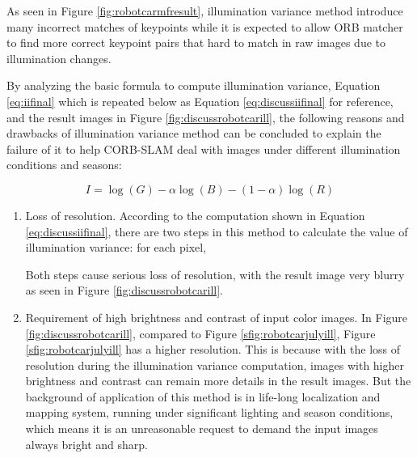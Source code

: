As seen in Figure \ref{fig:robotcarmfresult}, illumination variance method introduce many incorrect matches of keypoints while it is expected to allow ORB matcher to find more correct keypoint pairs that hard to match in raw images due to illumination changes. 

By analyzing the basic formula to compute illumination variance, Equation \ref{eq:iifinal} which is repeated below as Equation \ref{eq:discussiifinal} for reference, and the result images in Figure \ref{fig:discussrobotcarill}, the following reasons and drawbacks of illumination variance method can be concluded to explain the failure of it to help CORB-SLAM deal with images under different illumination conditions and seasons: 

\begin{equation}
I=\log(G)-\alpha\log(B)-(1-\alpha)\log(R)
\label{eq:discussiifinal}
\end{equation}

\begin{enumerate}[1.]
	\item Loss of resolution. According to the computation shown in Equation \ref{eq:discussiifinal}, there are two steps in this method to calculate the value of illumination variance: for each pixel, 
	Both steps cause serious loss of resolution, with the result image very blurry as seen in Figure \ref{fig:discussrobotcarill}. 
	
	\item Requirement of high brightness and contrast of input color images. In Figure \ref{fig:discussrobotcarill}, compared to Figure \ref{sfig:robotcarjulyill}, Figure \ref{sfig:robotcarjulyill} has a higher resolution. This is because with the loss of resolution during the illumination variance computation, images with higher brightness and contrast can remain more details in the result images. But the background of application of this method is in life-long localization and mapping system, running under significant lighting and season conditions, which means it is an unreasonable request to demand the input images always bright and sharp.
	
\end{enumerate}


